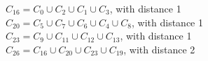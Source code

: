 \begin{minipage}{0.48\textwidth}
$C_{16} = C_0 \cup C_2 \cup C_1 \cup C_3$, with distance 1 \\  
$C_{20} = C_5 \cup C_7 \cup C_6 \cup C_4 \cup C_8$, with distance 1 \\ 
$C_{23} = C_9 \cup C_{11} \cup C_{12} \cup C_{13}$, with distance 1 \\ 
$C_{26} = C_{16} \cup C_{20} \cup C_{23} \cup C_{19}$, with distance 2 \\         
\end{minipage} 






